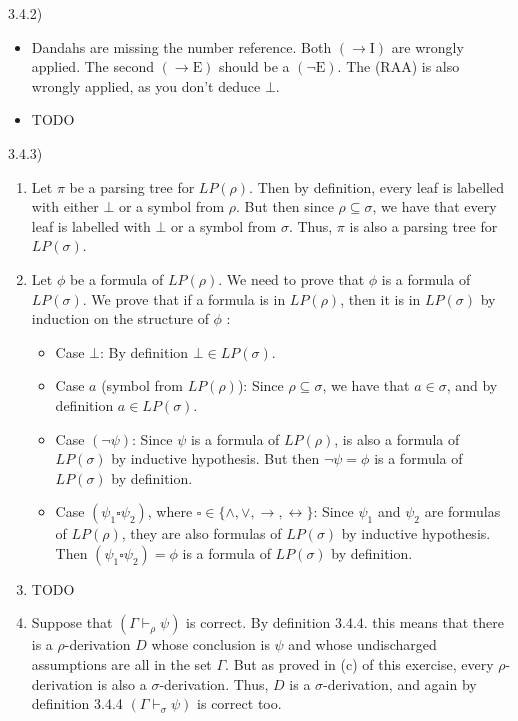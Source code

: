 \documentclass{article}
\theoremstyle{definition}
\newcommand{\ra}{\rightarrow}
\newcommand{\lra}{\leftrightarrow}
\begin{document}
3.4.2)
\begin{itemize}
  \item Dandahs are missing the number reference. Both \((\to \text{I})\) are
  wrongly applied. The second \((\to \text{E})\) should be a \((\neg
  \text{E})\). The (RAA) is also wrongly applied, as you don't deduce \(\bot\).
  \item TODO
\end{itemize}
3.4.3)
\begin{enumerate}
  \item Let \(\pi\) be a parsing tree for \(LP(\rho)\). Then by definition,
  every leaf is labelled with either \(\bot\) or a symbol from \(\rho\). But
  then since \(\rho \subseteq \sigma\), we have that every leaf is labelled
  with \(\bot\) or a symbol from \(\sigma\).
  Thus, \(\pi\) is also a parsing tree for \(LP(\sigma)\).
  \item Let \(\phi\) be a formula of \(LP(\rho)\). We need to prove that
  \(\phi\) is a formula of \(LP(\sigma)\). We prove that if a formula is in
  \(LP(\rho)\), then it is in \(LP(\sigma)\) by induction on the structure of
  \(\phi\) :
  \begin{itemize}
    \item Case \(\bot\): By definition \(\bot \in LP(\sigma)\).
    \item Case \(a\) (symbol from \(LP(\rho)\)): Since \(\rho \subseteq
    \sigma\), we have that \(a \in \sigma\), and by definition \(a \in
    LP(\sigma)\).
    \item Case \((\neg \psi)\): Since \(\psi\) is a formula of \(LP(\rho)\),
    is also a formula of \(LP(\sigma)\) by inductive hypothesis. But then
    \(\neg \psi = \phi\) is a formula of \(LP(\sigma)\) by definition.
    \item Case \((\psi_1 \square \psi_2)\), where \(\square \in \{\land, \lor, \ra, \lra\}\): Since \(\psi_1\) and \(\psi_2\) are formulas of \(LP(\rho)\),
    they are also formulas of \(LP(\sigma)\) by inductive hypothesis. Then
    \((\psi_1 \square \psi_2) = \phi\) is a formula of \(LP(\sigma)\) by
    definition.
  \end{itemize}
  \item TODO
  \item Suppose that \((\Gamma \vdash_{\rho} \psi)\) is correct. By
  definition 3.4.4. this means that there is a \(\rho\)-derivation \(D\)
  whose conclusion is \(\psi\) and whose undischarged assumptions are all in
  the set \(\Gamma\). But as proved in (c) of this exercise, every
  \(\rho\)-derivation is also a \(\sigma\)-derivation. Thus, \(D\) is a
  \(\sigma\)-derivation, and again by definition 3.4.4 \((\Gamma
  \vdash_{\sigma} \psi)\) is correct too.
\end{enumerate}
\end{document}
